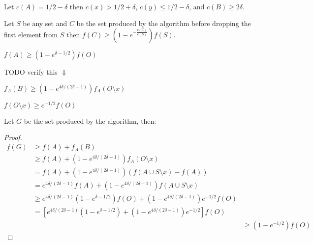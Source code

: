 Let $c(A) = 1/2 - \delta$ 
then $c(x) > 1/2 + \delta$, $c(y) \leq 1/2 - \delta$, and $c(B) \geq 2\delta$.

\begin{lemma}
Let $S$ be any set and $C$ be the set produced by the algorithm 
before dropping the first element from $S$ then $f(C) \geq (1 - e^{-\frac{c(C)}{c(S)}})f(S)$.  
\end{lemma} 

\begin{observation}
$f(A) \geq (1 - e^{\delta - 1/2})f(O)$
\end{observation}

TODO verify this $\Downarrow$
\begin{observation}
$f_A(B) \geq (1 - e^{4\delta / (2\delta - 1)})f_A(O \setminus x)$
\end{observation}

\begin{observation}
$f(O \setminus x) \geq e^{-1/2}f(O)$
\end{observation}

Let $G$ be the set produced by the algorithm, then:
\begin{proof}
\def\arraystretch{1.5}
$$
\begin{array}{lll}
% 
f(G) & \geq f(A) + f_A(B)
\\& \geq f(A) + (1 - e^{4\delta / (2\delta - 1)})f_A(O \setminus x)
\\& = f(A) + (1 - e^{4\delta / (2\delta - 1)})(f(A \cup S \setminus x) - f(A))
\\& = e^{4\delta / (2\delta - 1)}f(A) 
	+ (1 - e^{4\delta / (2\delta - 1)})f(A \cup S \setminus x)
\\& \geq e^{4\delta / (2\delta - 1)}(1 - e^{\delta - 1/2})f(O)
	+ (1 - e^{4\delta / (2\delta - 1)})e^{-1/2}f(O)
\\& = [
		e^{4\delta / (2\delta - 1)}(1 - e^{\delta - 1/2}) + (1 - e^{4\delta / (2\delta - 1)})e^{-1/2}
		]f(O)
\\&& \geq (1-e^{-1/2})f(O)
% 
\end{array}
$$
\end{proof}